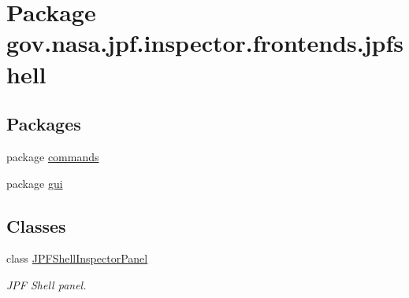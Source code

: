 \hypertarget{namespacegov_1_1nasa_1_1jpf_1_1inspector_1_1frontends_1_1jpfshell}{}\section{Package gov.\+nasa.\+jpf.\+inspector.\+frontends.\+jpfshell}
\label{namespacegov_1_1nasa_1_1jpf_1_1inspector_1_1frontends_1_1jpfshell}
\subsection*{Packages}
\begin{DoxyCompactItemize}
\item 
package \hyperlink{namespacegov_1_1nasa_1_1jpf_1_1inspector_1_1frontends_1_1jpfshell_1_1commands}{commands}
\item 
package \hyperlink{namespacegov_1_1nasa_1_1jpf_1_1inspector_1_1frontends_1_1jpfshell_1_1gui}{gui}
\end{DoxyCompactItemize}
\subsection*{Classes}
\begin{DoxyCompactItemize}
\item 
class \hyperlink{classgov_1_1nasa_1_1jpf_1_1inspector_1_1frontends_1_1jpfshell_1_1_j_p_f_shell_inspector_panel}{J\+P\+F\+Shell\+Inspector\+Panel}
\begin{DoxyCompactList}\small\item\em J\+PF Shell panel. \end{DoxyCompactList}\end{DoxyCompactItemize}
